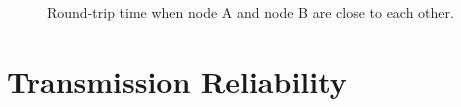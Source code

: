 \documentclass{article}
\begin{document}
\begin{figure}[htbp]
\centering
{}
\caption{Round-trip time when node A and node B are close to each other.}
\label{figure: rtt}
\end{figure}

\section{Transmission Reliability}
\end{document}
